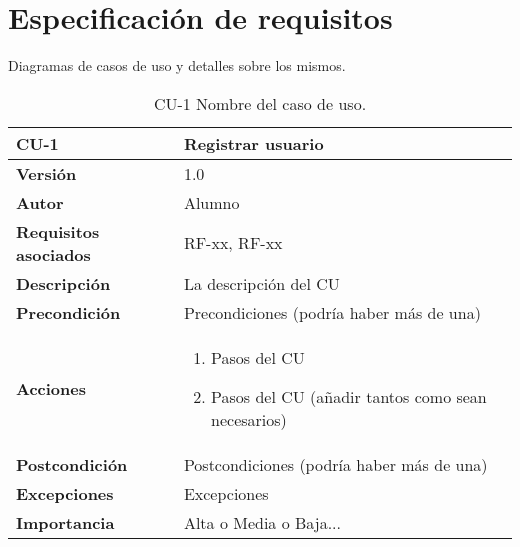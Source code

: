 \section{Especificación de requisitos}

Diagramas de casos de uso y detalles sobre los mismos.


\begin{table}[p]
	\centering
	\begin{tabularx}{\linewidth}{ p{} p{} }
		\toprule
		\textbf{CU-1}    & \textbf{Registrar usuario}\\
		\toprule
		\textbf{Versión}              & 1.0    \\
		\textbf{Autor}                & Alumno \\
		\textbf{Requisitos asociados} & RF-xx, RF-xx \\
		\textbf{Descripción}          & La descripción del CU \\
		\textbf{Precondición}         & Precondiciones (podría haber más de una) \\
		\textbf{Acciones}             &
		\begin{enumerate}
			\def\labelenumi{\arabic{enumi}.}
			\tightlist
			\item Pasos del CU
			\item Pasos del CU (añadir tantos como sean necesarios)
		\end{enumerate}\\
		\textbf{Postcondición}        & Postcondiciones (podría haber más de una) \\
		\textbf{Excepciones}          & Excepciones \\
		\textbf{Importancia}          & Alta o Media o Baja... \\
		\bottomrule
	\end{tabularx}
	\caption{CU-1 Nombre del caso de uso.}
\end{table}



